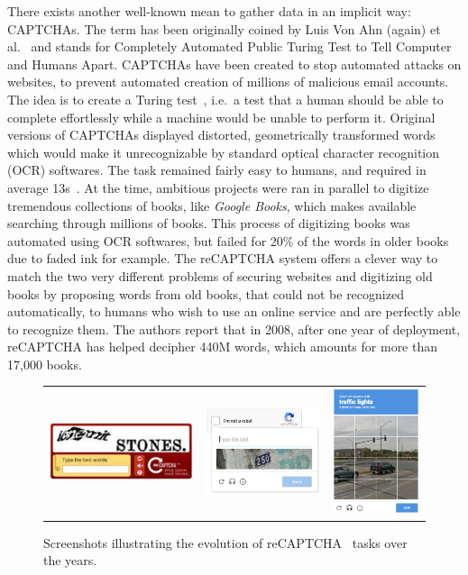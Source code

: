 There exists another well-known mean to gather data in an implicit way: CAPTCHAs.
The term has been originally coined by
Luis Von Ahn (again) et al.~\cite{von2003captcha} and stands for
Completely Automated Public Turing Test to Tell Computer and Humans Apart.
CAPTCHAs have been created to stop automated attacks on websites,
to prevent automated creation of millions of malicious email accounts.
The idea is to create a Turing test~\cite{machinery1950computing},
i.e.\ a test that a human should be able to complete effortlessly
while a machine would be unable to perform it.
Original versions of CAPTCHAs displayed distorted,
geometrically transformed words which would make it unrecognizable
by standard optical character recognition (OCR) softwares.
The task remained fairly easy to humans,
and required in average 13s~\cite{von2008recaptcha}.
At the time, ambitious projects were ran in parallel to digitize
tremendous collections of books, like \textit{Google Books},
which makes available searching through millions of books.
This process of digitizing books was automated using OCR softwares,
but failed for 20\% of the words in older books due to faded ink for example.
The reCAPTCHA system offers a clever way to match the two very different
problems of securing websites and digitizing old books by proposing words from old books,
that could not be recognized automatically,
to humans who wish to use an online service and are perfectly able to recognize them.
The authors report that in 2008, after one year of deployment,
reCAPTCHA has helped decipher 440M words, which amounts for more than 17,000 books.

\begin{figure}
	\centering
	\begin{tabular}{ccc}
\includegraphics[width=5cm]{assets/img/recaptcha.png} & \includegraphics[width=4cm]{assets/img/recaptcha-streetview.jpg} &
\includegraphics[width=3cm]{assets/img/reCAPTCHA_v2.png} \\
	\end{tabular}
	\caption{Screenshots illustrating the evolution of reCAPTCHA~\cite{von2008recaptcha} tasks over the years.}%
	\label{fig:recaptcha}
\end{figure}

